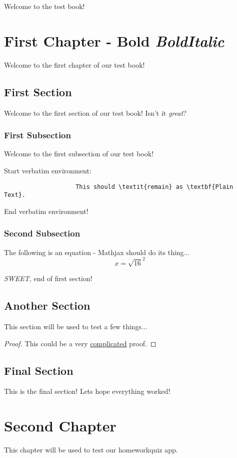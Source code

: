 \documentclass{camel}
\begin{document}
	Welcome to the test book!

	\chapter{First Chapter - \textbf{Bold \textit{BoldItalic}}}
		Welcome to the first chapter of our test book!

		\section{First Section}
			Welcome to the first section of our test book!
			Isn't it \emph{great}?

			\subsection{First Subsection}
				Welcome to the first subsection of our test book!

				Start verbatim environment:
				\begin{verbatim}
					This should \textit{remain} as \textbf{Plain Text}.
				\end{verbatim}
				End verbatim environment!

			\subsection{Second Subsection}
				The following is an equation - Mathjax should do its thing...
				\begin{equation}
					x = \sqrt{16}^2
				\end{equation}

			\textit{SWEET}, end of first section!

		\section{Another Section}
			This section will be used to test a few things...
			\begin{proof}
				This could be a very \underline{complicated} proof.
			\end{proof}

		\section{Final Section}
			This is the final section!
			Lets hope everything worked!

	\chapter{Second Chapter}
		This chapter will be used to test our homeworkquiz app.
\end{document}
